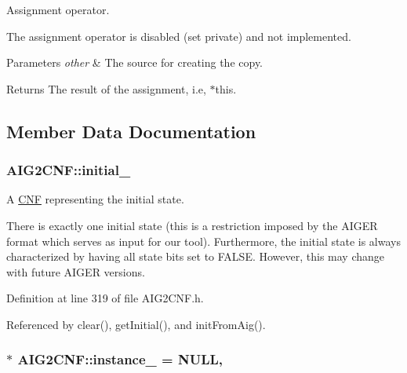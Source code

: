 Assignment operator. 

The assignment operator is disabled (set private) and not implemented.


\begin{DoxyParams}{Parameters}
{\em other} & The source for creating the copy. \\
\hline
\end{DoxyParams}
\begin{DoxyReturn}{Returns}
The result of the assignment, i.\-e, $\ast$this. 
\end{DoxyReturn}


\subsection{Member Data Documentation}
\hypertarget{classAIG2CNF_a83d0b27b61d672ecf2bd007e0d473439}{
\subsubsection[{initial\-\_\-}]{ A\-I\-G2\-C\-N\-F\-::initial\-\_\-\hspace{0.3cm}{\ttfamily [protected]}}}\label{classAIG2CNF_a83d0b27b61d672ecf2bd007e0d473439}


A \hyperlink{classCNF}{C\-N\-F} representing the initial state. 

There is exactly one initial state (this is a restriction imposed by the A\-I\-G\-E\-R format which serves as input for our tool). Furthermore, the initial state is always characterized by having all state bits set to F\-A\-L\-S\-E. However, this may change with future A\-I\-G\-E\-R versions. 

Definition at line 319 of file A\-I\-G2\-C\-N\-F.\-h.



Referenced by clear(), get\-Initial(), and init\-From\-Aig().

\hypertarget{classAIG2CNF_ae298ae4804c63f5bac4dfab7528d35ad}{
\subsubsection[{instance\-\_\-}]{ $\ast$ A\-I\-G2\-C\-N\-F\-::instance\-\_\- = N\-U\-L\-L\hspace{0.3cm}{\ttfamily [static]}, {\ttfamily [private]}}}\label{classAIG2CNF_ae298ae4804c63f5bac4dfab7528d35ad}


